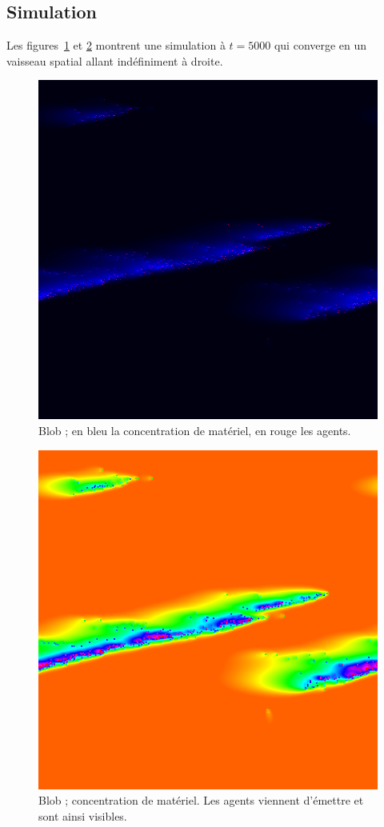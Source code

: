 \documentclass[11pt]{scrartcl}
\begin{document}
        \subsection{Simulation}
            Les figures~\ref{fig:phy-rgb} et \ref{fig:phy-hsv} montrent une simulation à $t = 5000$ qui converge en un vaisseau spatial allant
            indéfiniment à droite.
            
            \begin{figure}[h]
                \centering
                \includegraphics[width=\textwidth]{physarum_rgb}
                \caption{Blob ; en bleu la concentration de matériel, en rouge les agents.}\label{fig:phy-rgb}
            \end{figure}
            
            \begin{figure}[h]
                \centering
                \includegraphics[width=\textwidth]{physarum_hsv}
                \caption{Blob ; concentration de matériel. Les agents viennent d'émettre et sont ainsi visibles.}\label{fig:phy-hsv}
            \end{figure}
    
\end{document}
